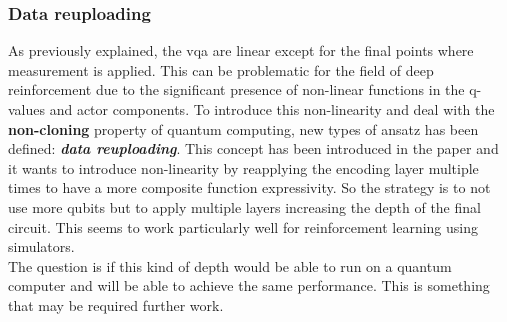 \subsubsection{Data reuploading}
As previously explained, the \acrlong{vqa} are linear except for the final points where measurement is applied. This can be problematic for the field of deep reinforcement due to the significant presence of non-linear functions in the q-values and actor components. To introduce this non-linearity and deal with the \textbf{non-cloning} property of quantum computing, new types of ansatz has been defined: \textit{\textbf{data reuploading}}.
This concept has been introduced in the paper \cite{P_rez_Salinas_2020} and it wants to introduce non-linearity by reapplying the encoding layer multiple times to have a more composite function expressivity. So the strategy is to not use more qubits but to apply multiple layers increasing the depth of the final circuit. This seems to work particularly well for reinforcement learning using simulators.\\
The question is if this kind of depth would be able to run on a quantum computer and will be able to achieve the same performance. This is something that may be required further work.
